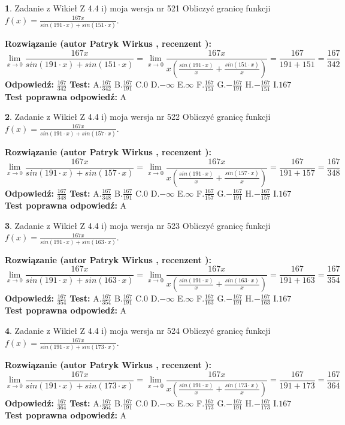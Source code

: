 \documentclass[12pt, a4paper]{article}
\theoremstyle{definition} %
\newtheorem{zad}{}
\newcommand{\zadStart}[1]{\begin{zad}#1\newline}
\newcommand{\zadStop}{\end{zad}}
\newcommand{\rozwStart}[2]{\noindent \textbf{Rozwiązanie (autor #1 , recenzent #2): }\newline}
\newcommand{\rozwStop}{\newline}
\newcommand{\odpStart}{\noindent \textbf{Odpowiedź:}\newline}
\newcommand{\odpStop}{\newline}
\newcommand{\testStart}{\noindent \textbf{Test:}\newline}
\newcommand{\testStop}{\newline}
\newcommand{\kluczStart}{\noindent \textbf{Test poprawna odpowiedź:}\newline}
\newcommand{\kluczStop}{\newline}
\begin{document}
\zadStart{Zadanie z Wikieł Z 4.4 i) moja wersja nr 521}
Obliczyć granicę funkcji $f(x)=\frac{167x}{sin(191\cdot x) +sin(151\cdot x)}$.
\zadStop
\rozwStart{Patryk Wirkus}{}
$$\lim\limits_{x\to 0}\frac{167x}{sin(191\cdot x) +sin(151\cdot x)}=\lim\limits_{x\to 0}\frac{167x}{x(\frac{sin(191\cdot x)}{x}+\frac{sin(151\cdot x)}{x})}=\frac{167}{191+151} = \frac{167}{342}$$
\rozwStop
\odpStart
$\frac{167}{342}$
\odpStop
\testStart
A.$\frac{167}{342}$
B.$\frac{167}{191}$
C.$0$
D.$-\infty$
E.$\infty$
F.$\frac{167}{151}$
G.$-\frac{167}{191}$
H.$-\frac{167}{151}$
I.$167$
\testStop
\kluczStart
A
\kluczStop



\zadStart{Zadanie z Wikieł Z 4.4 i) moja wersja nr 522}
Obliczyć granicę funkcji $f(x)=\frac{167x}{sin(191\cdot x) +sin(157\cdot x)}$.
\zadStop
\rozwStart{Patryk Wirkus}{}
$$\lim\limits_{x\to 0}\frac{167x}{sin(191\cdot x) +sin(157\cdot x)}=\lim\limits_{x\to 0}\frac{167x}{x(\frac{sin(191\cdot x)}{x}+\frac{sin(157\cdot x)}{x})}=\frac{167}{191+157} = \frac{167}{348}$$
\rozwStop
\odpStart
$\frac{167}{348}$
\odpStop
\testStart
A.$\frac{167}{348}$
B.$\frac{167}{191}$
C.$0$
D.$-\infty$
E.$\infty$
F.$\frac{167}{157}$
G.$-\frac{167}{191}$
H.$-\frac{167}{157}$
I.$167$
\testStop
\kluczStart
A
\kluczStop



\zadStart{Zadanie z Wikieł Z 4.4 i) moja wersja nr 523}
Obliczyć granicę funkcji $f(x)=\frac{167x}{sin(191\cdot x) +sin(163\cdot x)}$.
\zadStop
\rozwStart{Patryk Wirkus}{}
$$\lim\limits_{x\to 0}\frac{167x}{sin(191\cdot x) +sin(163\cdot x)}=\lim\limits_{x\to 0}\frac{167x}{x(\frac{sin(191\cdot x)}{x}+\frac{sin(163\cdot x)}{x})}=\frac{167}{191+163} = \frac{167}{354}$$
\rozwStop
\odpStart
$\frac{167}{354}$
\odpStop
\testStart
A.$\frac{167}{354}$
B.$\frac{167}{191}$
C.$0$
D.$-\infty$
E.$\infty$
F.$\frac{167}{163}$
G.$-\frac{167}{191}$
H.$-\frac{167}{163}$
I.$167$
\testStop
\kluczStart
A
\kluczStop



\zadStart{Zadanie z Wikieł Z 4.4 i) moja wersja nr 524}
Obliczyć granicę funkcji $f(x)=\frac{167x}{sin(191\cdot x) +sin(173\cdot x)}$.
\zadStop
\rozwStart{Patryk Wirkus}{}
$$\lim\limits_{x\to 0}\frac{167x}{sin(191\cdot x) +sin(173\cdot x)}=\lim\limits_{x\to 0}\frac{167x}{x(\frac{sin(191\cdot x)}{x}+\frac{sin(173\cdot x)}{x})}=\frac{167}{191+173} = \frac{167}{364}$$
\rozwStop
\odpStart
$\frac{167}{364}$
\odpStop
\testStart
A.$\frac{167}{364}$
B.$\frac{167}{191}$
C.$0$
D.$-\infty$
E.$\infty$
F.$\frac{167}{173}$
G.$-\frac{167}{191}$
H.$-\frac{167}{173}$
I.$167$
\testStop
\kluczStart
A
\kluczStop
\end{document}
